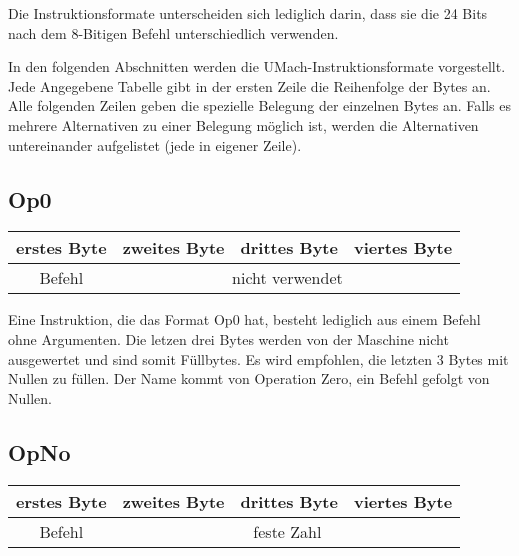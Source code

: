 Die Instruktionsformate unterscheiden sich lediglich darin, dass sie die 24 Bits
nach dem 8-Bitigen \gls{Befehl} unterschiedlich verwenden.

In den folgenden Abschnitten werden die UMach-Instruktionsformate vorgestellt.
Jede Angegebene Tabelle gibt in der ersten Zeile die Reihenfolge der Bytes an. 
Alle folgenden Zeilen geben die spezielle Belegung der einzelnen Bytes an.
Falls es mehrere Alternativen zu einer Belegung möglich ist, werden die
Alternativen untereinander aufgelistet (jede in eigener Zeile).





\subsection{Op0}

\begin{center}
  \begin{tabular}{|*{4}{c|}}
    \hline
    erstes Byte   & zweites Byte  & drittes Byte  & viertes Byte
    \\\hline\hline
    Befehl        & \multicolumn{3}{c|}{nicht verwendet}
    \\\hline
  \end{tabular}
\end{center}

Eine Instruktion, die das Format Op0 hat, besteht lediglich aus einem Befehl
ohne Argumenten. Die letzen drei Bytes werden von der Maschine nicht
ausgewertet und sind somit Füllbytes. Es wird empfohlen, die letzten 3 Bytes mit
Nullen zu füllen.
Der Name kommt von \glqq Operation Zero\grqq, ein Befehl gefolgt von Nullen.




\subsection{OpNo}

\begin{center}
  \begin{tabular}{|*{4}{c|}}
    \hline
    erstes Byte   & zweites Byte  & drittes Byte  & viertes Byte
    \\\hline\hline
    Befehl        & \multicolumn{3}{c|}{feste Zahl}
    \\\hline
  \end{tabular}
\end{center}

